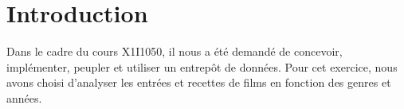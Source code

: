 \chapter*{Introduction}
 
Dans le cadre du cours X1I1050, il nous a été demandé de concevoir, implémenter, peupler et utiliser un entrepôt de données. Pour cet exercice, nous avons choisi d'analyser les entrées et recettes de films en fonction des genres et années.